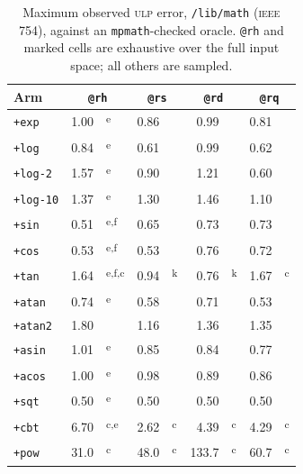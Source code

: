 \documentclass[twoside]{article}
\begin{document}
\begin{table}[h]
\centering
\caption{Maximum observed \textsc{ulp} error, \texttt{/lib/math} (\textsc{ieee} 754), against an \texttt{mpmath}-checked oracle.  \texttt{@rh} and marked cells are exhaustive over the full input space; all others are sampled.}
\label{tab:ulp-math}
\begin{tabular}{l r@{}l r@{}l r@{}l r@{}l}
\toprule
Arm & \multicolumn{2}{c}{\texttt{@rh}} & \multicolumn{2}{c}{\texttt{@rs}} & \multicolumn{2}{c}{\texttt{@rd}} & \multicolumn{2}{c}{\texttt{@rq}} \\
\midrule
\texttt{+exp}     & 1.00 & \textsuperscript{e}   & 0.86  & {} & 0.99  & {} & 0.81 & {} \\
\texttt{+log}     & 0.84 & \textsuperscript{e}   & 0.61  & {} & 0.99  & {} & 0.62 & {} \\
\texttt{+log-2}   & 1.57 & \textsuperscript{e}   & 0.90  & {} & 1.21  & {} & 0.60 & {} \\
\texttt{+log-10}  & 1.37 & \textsuperscript{e}   & 1.30  & {} & 1.46  & {} & 1.10 & {} \\
\texttt{+sin}     & 0.51 & \textsuperscript{e,f} & 0.65  & {} & 0.73  & {} & 0.73 & {} \\
\texttt{+cos}     & 0.53 & \textsuperscript{e,f} & 0.53  & {} & 0.76  & {} & 0.72 & {} \\
\texttt{+tan}     & 1.64 & \textsuperscript{e,f,c} & 0.94  & \textsuperscript{k} & 0.76  & \textsuperscript{k} & 1.67 & \textsuperscript{c} \\
\texttt{+atan}    & 0.74 & \textsuperscript{e}   & 0.58  & {} & 0.71  & {} & 0.53 & {} \\
\texttt{+atan2}   & 1.80 & {}                    & 1.16  & {} & 1.36  & {} & 1.35 & {} \\
\texttt{+asin}    & 1.01 & \textsuperscript{e}   & 0.85  & {} & 0.84  & {} & 0.77 & {} \\
\texttt{+acos}    & 1.00 & \textsuperscript{e}   & 0.98  & {} & 0.89  & {} & 0.86 & {} \\
\texttt{+sqt}     & 0.50 & \textsuperscript{e}   & 0.50  & {} & 0.50  & {} & 0.50 & {} \\
\texttt{+cbt}     & 6.70 & \textsuperscript{c,e} & 2.62  & \textsuperscript{c} & 4.39  & \textsuperscript{c} & 4.29 & \textsuperscript{c} \\
\texttt{+pow}     & 31.0 & \textsuperscript{c}   & 48.0  & \textsuperscript{c} & 133.7 & \textsuperscript{c} & 60.7 & \textsuperscript{c} \\
\bottomrule
\end{tabular}
\end{table}
\end{document}
